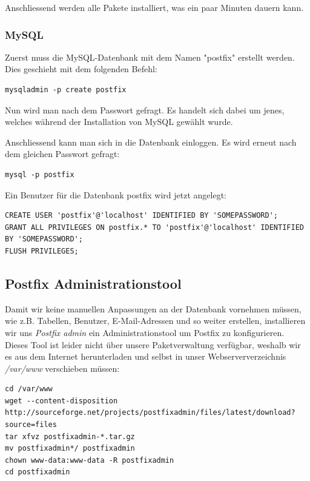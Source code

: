 Anschliessend werden alle Pakete installiert, was ein paar Minuten dauern kann.

\subsubsection{MySQL}
Zuerst muss die MySQL-Datenbank mit dem Namen "postfix" erstellt werden. Dies geschieht mit dem folgenden Befehl:

\begin{lstlisting}
mysqladmin -p create postfix
\end{lstlisting}

Nun wird man nach dem Passwort gefragt. Es handelt sich dabei um jenes, welches während der Installation von MySQL gewählt wurde.

Anschliessend kann man sich in die Datenbank einloggen. Es wird erneut nach dem gleichen Passwort gefragt:

\begin{lstlisting}
mysql -p postfix
\end{lstlisting}

Ein Benutzer für die Datenbank postfix wird jetzt angelegt:

\begin{lstlisting}
CREATE USER 'postfix'@'localhost' IDENTIFIED BY 'SOMEPASSWORD';
GRANT ALL PRIVILEGES ON postfix.* TO 'postfix'@'localhost' IDENTIFIED BY 'SOMEPASSWORD';
FLUSH PRIVILEGES;
\end{lstlisting}

\subsection{Postfix Administrationstool}

Damit wir keine manuellen Anpassungen an der Datenbank vornehmen müssen, wie z.B. Tabellen, Benutzer, E-Mail-Adressen und so weiter erstellen, installieren wir uns \textit{Postfix admin} ein Administrationstool um Postfix zu konfigurieren. \\

Dieses Tool ist leider nicht über unsere Paketverwaltung verfügbar, weshalb wir es aus dem Internet herunterladen und selbst in unser Webserververzeichnis \textit{/var/www} verschieben müssen:

\begin{lstlisting}
cd /var/www
wget --content-disposition http://sourceforge.net/projects/postfixadmin/files/latest/download?source=files
tar xfvz postfixadmin-*.tar.gz
mv postfixadmin*/ postfixadmin
chown www-data:www-data -R postfixadmin
cd postfixadmin
\end{lstlisting}

